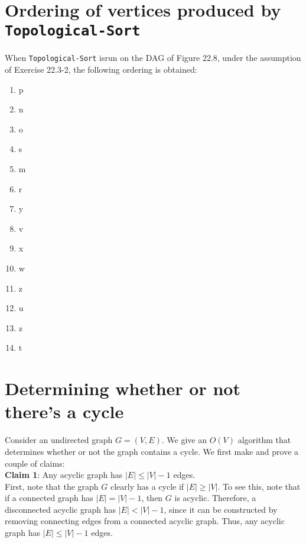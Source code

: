 \documentclass[paper=a4, fontsize=11pt]{scrartcl} %
\numberwithin{equation}{section} %
\numberwithin{figure}{section} %
\numberwithin{table}{section} %
\begin{document}

\section{Ordering of vertices produced by \texttt{Topological-Sort}}

When \texttt{Topological-Sort} isrun on the DAG of Figure 22.8, under the assumption of Exercise 22.3-2, the following ordering is obtained:
\begin{enumerate}
\item p
\item n
\item o
\item s
\item m
\item r
\item y
\item v
\item x
\item w
\item z
\item u
\item z
\item t
\end{enumerate}


\section{Determining whether or not there's a cycle}

Consider an undirected graph $G = (V, E)$. We give an $O(V)$ algorithm that determines whether or not the graph contains a cycle. We first make and prove a couple of claims:\\

\textbf{Claim 1}: Any acyclic graph has $|E| \leq |V| - 1$ edges.\\

First, note that the graph $G$ clearly has a cycle if $|E| \geq |V|$. To see this, note that if a connected graph has $|E| = |V| - 1$, then $G$ is acyclic. Therefore, a disconnected acyclic graph has $|E| < |V| - 1$, since it can be constructed by removing connecting edges from a connected acyclic graph. Thus, any acyclic graph has $|E| \leq |V| - 1$ edges.\\
\end{document}
